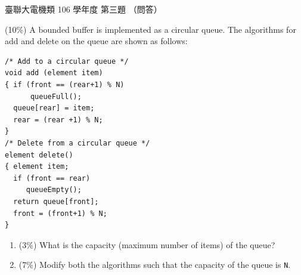 \begin{pastexam}[label={px:ust-106-ee-ds-03}]{臺聯大電機類 106 學年度 第三題}
（問答）

(10\%) A bounded buffer is implemented as a circular queue. The algorithms for add and delete on the
queue are shown as follows:
\begin{verbatim}
/* Add to a circular queue */
void add (element item)
{ if (front == (rear+1) % N)
      queueFull();
  queue[rear] = item;
  rear = (rear +1) % N;
}
/* Delete from a circular queue */
element delete()
{ element item;
  if (front == rear)
     queueEmpty();
  return queue[front];
  front = (front+1) % N;
}
\end{verbatim}
\begin{enumerate}
\item[(一)] (3\%) What is the capacity (maximum number of items) of the queue?
\item[(二)] (7\%) Modify both the algorithms such that the capacity of the queue is \texttt{N}.
\end{enumerate}
\end{pastexam}

